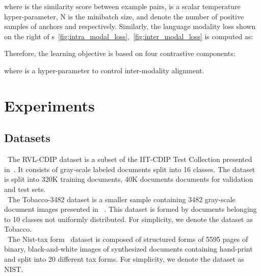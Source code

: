 \documentclass[preprint,review,12pt]{elsarticle}
\begin{document}
\normalsize
where  is the similarity score between example pairs,  is a scalar temperature hyper-parameter, N is the minibatch size,  and  denote the number of positive samples of anchors  and  respectively. 
Similarly, the language modality loss shown on the right of \figurename s~\ref{fig:intra_modal_loss},~\ref{fig:inter_modal_loss} is computed as: 
\small

\normalsize
Therefore, the learning objective is based on four contrastive components:
\small

\normalsize
where  is a hyper-parameter to control inter-modality alignment.

\section{Experiments}
\subsection{Datasets}
 \, The RVL-CDIP dataset is a subset of the IIT-CDIP Test Collection presented in~\cite{harley2015evaluation}. It consists of gray-scale labeled documents split into 16 classes. The dataset is split into 320K training documents, 40K documents documents for validation and test sets.\\
 \, The Tobacco-3482 dataset is a smaller sample containing 3482 gray-scale document images presented in ~\cite{kumar2014structural}. This dataset is formed by documents belonging to 10 classes not uniformly distributed. For simplicity, we denote the dataset as Tobacco. \\
 \, The Nist-tax form~\cite{dimmick1991nist} dataset is composed of structured forms of 5595 pages of binary, black-and-white images of synthesized documents containing hand-print and split into 20 different tax forms. For simplicity, we denote the dataset as NIST.
\end{document}
